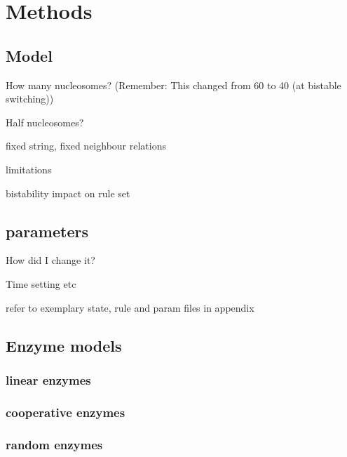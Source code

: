 \chapter{Methods}
    \label{cha:methods}
    \section{Model}
        \begin{itemize}
            {
                \color{red}
                \item How many nucleosomes? (Remember: This changed from 60 to 40 (at bistable switching))
                \item Half nucleosomes?
                \item fixed string, fixed neighbour relations
                \item limitations
                \item bistability impact on rule set
            }
        \end{itemize}
    \section{\ed parameters}
        \begin{itemize}
            {
                \color{red}
                \item How did I change it?
                \item Time setting etc
                \item refer to exemplary state, rule and param files in appendix
            }
            \end{itemize}
    \section{Enzyme models} %
        \subsection{linear enzymes}

        \subsection{cooperative enzymes}

        \subsection{random enzymes}

